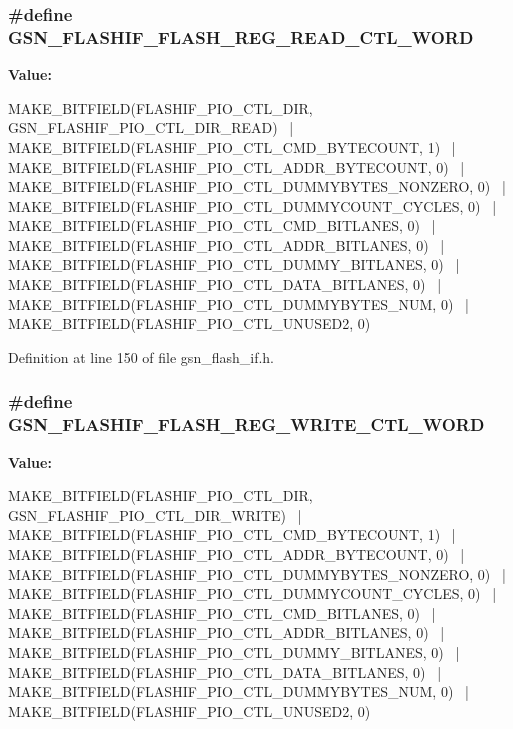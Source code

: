 \hypertarget{a00501_a48db0a1a6487d75cc26e47b6ed5aa530}{
\subsubsection[{GSN\_\-FLASHIF\_\-FLASH\_\-REG\_\-READ\_\-CTL\_\-WORD}]{\setlength{\rightskip}{0pt plus 5cm}\#define GSN\_\-FLASHIF\_\-FLASH\_\-REG\_\-READ\_\-CTL\_\-WORD}}
\label{a00501_a48db0a1a6487d75cc26e47b6ed5aa530}
{\bfseries Value:}
\begin{DoxyCode}
MAKE_BITFIELD(FLASHIF_PIO_CTL_DIR, GSN_FLASHIF_PIO_CTL_DIR_READ) \
        | MAKE_BITFIELD(FLASHIF_PIO_CTL_CMD_BYTECOUNT, 1) \
        | MAKE_BITFIELD(FLASHIF_PIO_CTL_ADDR_BYTECOUNT, 0) \
        | MAKE_BITFIELD(FLASHIF_PIO_CTL_DUMMYBYTES_NONZERO, 0) \
        | MAKE_BITFIELD(FLASHIF_PIO_CTL_DUMMYCOUNT_CYCLES, 0) \
        | MAKE_BITFIELD(FLASHIF_PIO_CTL_CMD_BITLANES, 0) \
        | MAKE_BITFIELD(FLASHIF_PIO_CTL_ADDR_BITLANES, 0) \
        | MAKE_BITFIELD(FLASHIF_PIO_CTL_DUMMY_BITLANES, 0) \
        | MAKE_BITFIELD(FLASHIF_PIO_CTL_DATA_BITLANES, 0) \
        | MAKE_BITFIELD(FLASHIF_PIO_CTL_DUMMYBYTES_NUM, 0) \
        | MAKE_BITFIELD(FLASHIF_PIO_CTL_UNUSED2, 0)
\end{DoxyCode}


Definition at line 150 of file gsn\_\-flash\_\-if.h.

\hypertarget{a00501_a33e15dee99ee2bf69a56f4b01787c0c3}{
\subsubsection[{GSN\_\-FLASHIF\_\-FLASH\_\-REG\_\-WRITE\_\-CTL\_\-WORD}]{\setlength{\rightskip}{0pt plus 5cm}\#define GSN\_\-FLASHIF\_\-FLASH\_\-REG\_\-WRITE\_\-CTL\_\-WORD}}
\label{a00501_a33e15dee99ee2bf69a56f4b01787c0c3}
{\bfseries Value:}
\begin{DoxyCode}
MAKE_BITFIELD(FLASHIF_PIO_CTL_DIR, GSN_FLASHIF_PIO_CTL_DIR_WRITE) \
        | MAKE_BITFIELD(FLASHIF_PIO_CTL_CMD_BYTECOUNT, 1) \
        | MAKE_BITFIELD(FLASHIF_PIO_CTL_ADDR_BYTECOUNT, 0) \
        | MAKE_BITFIELD(FLASHIF_PIO_CTL_DUMMYBYTES_NONZERO, 0) \
        | MAKE_BITFIELD(FLASHIF_PIO_CTL_DUMMYCOUNT_CYCLES, 0) \
        | MAKE_BITFIELD(FLASHIF_PIO_CTL_CMD_BITLANES, 0) \
        | MAKE_BITFIELD(FLASHIF_PIO_CTL_ADDR_BITLANES, 0) \
        | MAKE_BITFIELD(FLASHIF_PIO_CTL_DUMMY_BITLANES, 0) \
        | MAKE_BITFIELD(FLASHIF_PIO_CTL_DATA_BITLANES, 0) \
        | MAKE_BITFIELD(FLASHIF_PIO_CTL_DUMMYBYTES_NUM, 0) \
        | MAKE_BITFIELD(FLASHIF_PIO_CTL_UNUSED2, 0)
\end{DoxyCode}


